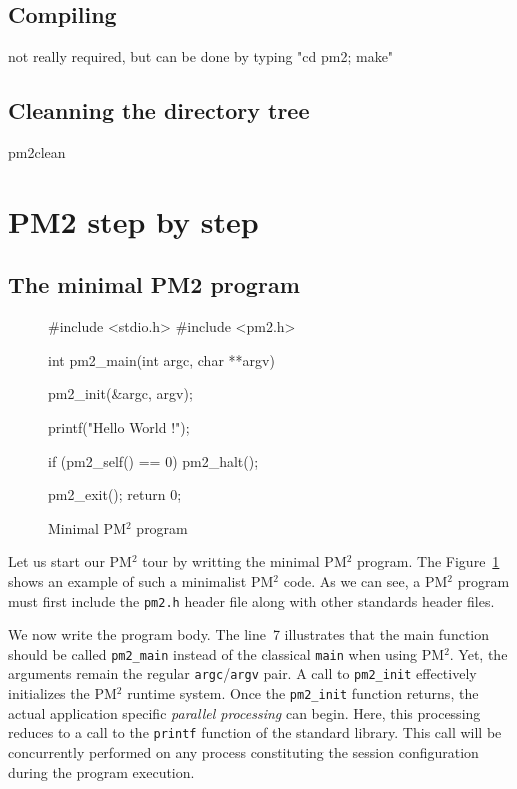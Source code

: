 \documentclass[a4paper,11pt]{article}
\def\pm2{PM$^2$\xspace}
\begin{document}
\subsection{Compiling}
        not really required, but can be done by typing "cd pm2; make"

\subsection{Cleanning the directory tree}
        pm2clean


\section{PM2 step by step}

\subsection{The minimal PM2 program}
\begin{figure}
\begin{center}
\begin{boxedminipage}{0.8\textwidth}
\begin{footnotesize}
\begin{listing}{0}
 #include <stdio.h>
 #include <pm2.h>

 int pm2_main(int argc, char **argv)
 {
   pm2_init(&argc, argv);

   printf("Hello World !\n");
  
   if (pm2_self() == 0)
     pm2_halt();
  
   pm2_exit();
   return 0;
 }
\end{listing}
\end{footnotesize}
\end{boxedminipage}
\end{center}
\caption{Minimal \pm2 program\label{fig:ex1}}
\end{figure}
Let us start our \pm2 tour by writting the minimal \pm2 program. The
Figure~\ref{fig:ex1} shows an example of such a minimalist \pm2
code. As we can see, a \pm2 program must first include the \texttt{pm2.h}
header file along with other standards header files. 

We now write the program body. The line~7 illustrates that the main
function should be called \texttt{pm2\_main} instead of the classical
\texttt{main} when using \pm2. Yet, the arguments remain the regular
\texttt{argc}/\texttt{argv} pair. A call to \texttt{pm2\_init}
effectively initializes the \pm2 runtime system. Once the
\texttt{pm2\_init} function returns, the actual application specific
\emph{parallel processing} can begin. Here, this processing reduces to
a call to the \texttt{printf} function of the standard library. This
call will be concurrently performed on any process constituting the
session configuration during the program execution.
\end{document}

